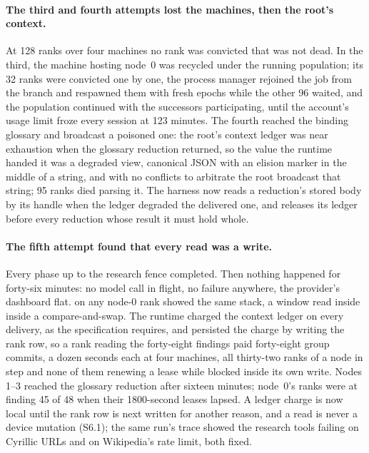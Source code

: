 \paragraph{The third and fourth attempts lost the machines, then the root's
context.} At 128 ranks over four machines no rank was convicted that was not
dead. In the third, the machine hosting node~0 was recycled under the running
population; its 32 ranks were convicted one by one, the process manager rejoined
the job from the branch and respawned them with fresh epochs while the other 96
waited, and the population continued with the successors participating, until
the account's usage limit froze every session at 123 minutes. The fourth reached
the binding glossary and broadcast a poisoned one: the root's context ledger was
near exhaustion when the glossary reduction returned, so the value the runtime
handed it was a degraded view, canonical JSON with an elision marker in the
middle of a string, and with no conflicts to arbitrate the root broadcast that
string; 95 ranks died parsing it. The harness now reads a reduction's stored body
by its handle when the ledger degraded the delivered one, and releases its
ledger before every reduction whose result it must hold whole.

\paragraph{The fifth attempt found that every read was a write.} Every phase up
to the research fence completed. Then nothing happened for forty-six minutes:
no model call in flight, no failure anywhere, the provider's dashboard flat.
 on any node-0 rank showed the same stack, a window read inside
 inside a compare-and-swap. The runtime charged the context ledger
on every delivery, as the specification requires, and persisted the charge by
writing the rank row, so a rank reading the forty-eight findings paid forty-eight
group commits, a dozen seconds each at four machines, all thirty-two ranks of a
node in step and none of them renewing a lease while blocked inside its own
write. Nodes 1--3 reached the glossary reduction after sixteen minutes; node~0's
ranks were at finding 45 of 48 when their 1800-second leases lapsed. A ledger
charge is now local until the rank row is next written for another reason, and a
read is never a device mutation (S6.1); the same run's trace showed the research
tools failing on Cyrillic URLs and on Wikipedia's rate limit, both fixed.

